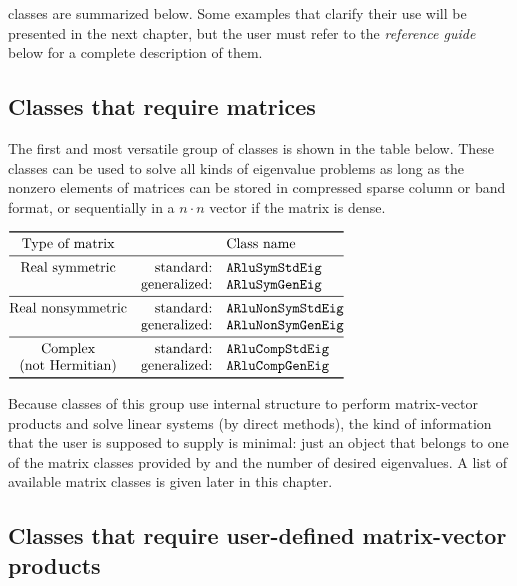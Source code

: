 \ARPP{} classes are summarized below. Some examples that clarify their use will be presented in the next chapter, but the user must refer to the \ARPP{} \textit{reference guide} below for a complete description of them.

\subsection{Classes that require matrices}

The first and most versatile group of \ARPP{} classes is shown in the table below. These classes can be used to solve all kinds of eigenvalue problems as long as the nonzero elements of matrices can be stored in compressed sparse column or band format, or sequentially in a $n \cdot n$ vector if the matrix is dense.

\begin{center}
	\renewcommand{\arraystretch}{1.2}
	$\begin{array}{@{}crl@{}}\toprule
	\text{Type of matrix} & & \text{Class name} \\\midrule
	\text{Real symmetric} & \text{standard:} & \texttt{ARluSymStdEig}\\
	& \text{generalized:} & \texttt{ARluSymGenEig}\\\midrule
	\text{Real nonsymmetric} & \text{standard:} & \texttt{ARluNonSymStdEig}\\
	& \text{generalized:} & \texttt{ARluNonSymGenEig}\\\midrule
	\text{Complex} & \text{standard:} & \texttt{ARluCompStdEig}\\
	\text{(not Hermitian)} & \text{generalized:} & \texttt{ARluCompGenEig}\\\bottomrule
	\end{array}$
\end{center}

Because classes of this group use \ARPP{} internal structure to perform matrix-vector products and solve linear systems (by direct methods), the kind of information that the user is supposed to supply is minimal: just an object that belongs to one of the matrix classes provided by \ARPP{} and the number of desired eigenvalues. A list of available matrix classes is given later in this chapter.

\subsection{Classes that require user-defined matrix-vector products}

